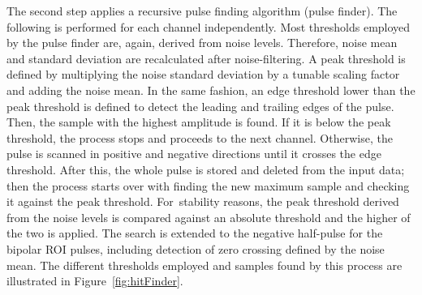 \documentclass[instruments,article,accept,moreauthors,pdftex]{Definitions/mdpi}
\begin{document}
The second step applies a recursive pulse finding algorithm (pulse finder).
The following is performed for each channel independently.
Most thresholds employed by the pulse finder are, again, derived from noise levels.
Therefore, noise mean and standard deviation are recalculated after noise-filtering.
A peak threshold is defined by multiplying the noise standard deviation by a tunable scaling factor and adding the noise mean.
In the same fashion, an edge threshold lower than the peak threshold is defined to detect the leading and trailing edges of the pulse.
Then, the sample with the highest amplitude is found.
If it is below the peak threshold, the process stops and proceeds to the next channel.
Otherwise, the pulse is scanned in positive and negative directions until it crosses the edge threshold.
After this, the whole pulse is stored and deleted from the input data; then the process starts over with finding the new maximum sample and checking it against the peak threshold.
For~stability reasons, the peak threshold derived from the noise levels is compared against an absolute threshold and the higher of the two is applied.
The search is extended to the negative half-pulse for the bipolar ROI pulses, including detection of zero crossing defined by the noise mean.
The different thresholds employed and samples found by this process are illustrated in Figure~\ref{fig:hitFinder}.
\end{document}
